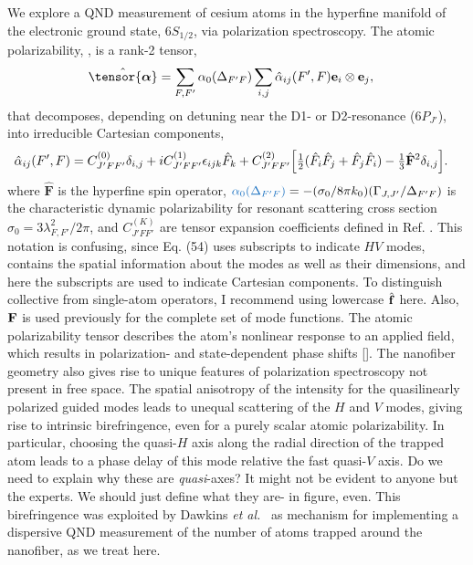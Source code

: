 \documentclass[preprint,aps,pra,onecolumn]{revtex4-1} %
\newcommand{\poltens}{\hat{\tensor{\boldsymbol{\alpha}}}}
\newcommand{\charpol}{\alpha_0(\Delta_{F'F})}
\newcommand{\change}[1]{{\color{RoyalBlue} #1}}
\newcommand{\comment}[1]{{\color{Maroon} #1}}
\begin{document}
We explore a QND measurement of cesium atoms in the hyperfine manifold of the electronic ground state, $6S_{1/2}$, via polarization spectroscopy.  \change{The atomic polarizability, \erf{Eq::PolarizabilityOperator}, is a rank-2 tensor,
\begin{align}
	\poltens &=  \sum_{F,F'} \charpol \sum_{i,j} \hat{\alpha}_{ij}(F',F) \mathbf{e}_i \otimes \mathbf{e}_j,
\end{align}
that decomposes, depending on detuning near the D1- or D2-resonance ($6P_{J'}$), into irreducible Cartesian components,
	\begin{align}
		\hat{\alpha}_{ij}(F',F)&=  C_{J'FF'}^{(0)} \delta_{i,j}+ iC_{J'FF'}^{(1)}\epsilon_{ijk}\hat{F}_k+ C_{J'FF'}^{(2)} \Big[ \mbox{$\frac{1}{2}$} ( \hat{F}_i\hat{F}_j +\hat{F}_j\hat{F}_i )-\mbox{$\frac{1}{3}$}\hat{\mathbf{F}}^2 \delta_{i,j} \Big]. \label{Eq::PolarizabilityIrrep}
\end{align}
}where $\hat{\mathbf{F}}$ is the hyperfine spin operator, \change{$\change{\charpol} = -(\sigma_0/8\pi k_0) (\Gamma_{J,J'}/\Delta_{F'F})$} is the characteristic dynamic polarizability for resonant scattering cross section \change{$\sigma_0 = 3 \lambda_{F,F'}^2/2\pi$}, and $C_{J'FF'}^{(K)}$ are tensor expansion coefficients defined in Ref. \cite{deutsch_quantum_2010}.  \comment{This notation is confusing, since Eq. (54) uses subscripts to indicate $HV$ modes, contains the spatial information about the modes as well as their dimensions, and here the subscripts are used to indicate Cartesian components.} \comment{To distinguish collective from single-atom operators, I recommend using lowercase $\hat{\mathbf{f}}$ here.  Also, $\mathbf{F}$ is used previously for the complete set of mode functions.}  The atomic polarizability tensor describes the atom's nonlinear response to an applied field, which results in polarization- and state-dependent phase shifts [].  The nanofiber geometry also gives rise to unique features of polarization spectroscopy not present in free space.  The spatial anisotropy of the intensity for the quasilinearly polarized guided modes leads to unequal scattering of the $H$ and $V$ modes, giving rise to intrinsic birefringence, even for a purely scalar atomic polarizability.  In particular, choosing the quasi-$H$ axis along the radial direction of the trapped atom leads to a phase delay of this mode relative the fast quasi-$V$ axis.  \change{ Do we need to explain why these are \emph{quasi}-axes?  It might not be evident to anyone but the experts.  We should just define what they are- in figure, even.} This birefringence was exploited by Dawkins {\em et al.}~\cite{dawkins_dispersive_2011} as mechanism for implementing a dispersive QND measurement of the number of atoms trapped around the nanofiber, as we treat here.
\end{document}
